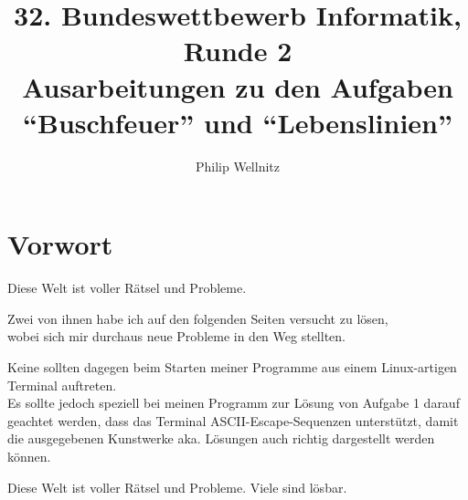 \documentclass[a4paper,12pt,table]{article}
\title{32. Bundeswettbewerb Informatik, Runde 2\\ \small{Ausarbeitungen zu den Aufgaben \enquote{Buschfeuer} und \enquote{Lebenslinien} }}
\author{Philip Wellnitz}
\date{}
\begin{document}
\thispagestyle{empty}
\maketitle
\newpage
\section*{Vorwort}

Diese Welt ist voller Rätsel und Probleme.

Zwei von ihnen habe ich auf den folgenden Seiten versucht zu lösen,\\ wobei sich mir durchaus neue Probleme in den Weg stellten.

Keine sollten dagegen beim Starten meiner Programme aus einem Linux-artigen Terminal auftreten. \\
Es sollte jedoch speziell bei meinen Programm zur Lösung von Aufgabe 1 darauf geachtet werden, dass das Terminal ASCII-Escape-Sequenzen unterstützt, damit die ausgegebenen Kunstwerke aka. Lösungen auch richtig dargestellt werden können.

Diese Welt ist voller Rätsel und Probleme. Viele sind lösbar.


\tableofcontents
\newpage

\newpage

\newpage
\end{document}
